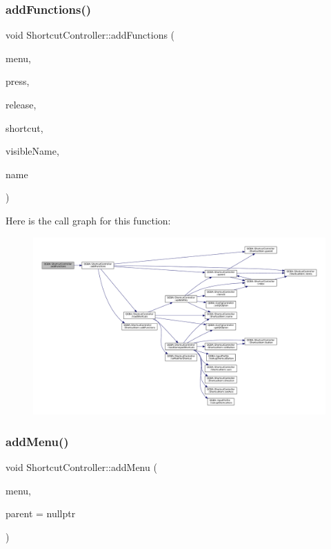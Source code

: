 \subsubsection{\texorpdfstring{add\+Functions()}{addFunctions()}\hspace{0.1cm}{\footnotesize\ttfamily [2/2]}}
{\footnotesize\ttfamily void Shortcut\+Controller\+::add\+Functions (\begin{DoxyParamCaption}\item[{Q\+Menu $\ast$}]{menu,  }\item[{std\+::function$<$ void()$>$}]{press,  }\item[{std\+::function$<$ void()$>$}]{release,  }\item[{const Q\+Key\+Sequence \&}]{shortcut,  }\item[{const Q\+String \&}]{visible\+Name,  }\item[{const Q\+String \&}]{name }\end{DoxyParamCaption})}

Here is the call graph for this function\+:
\nopagebreak
\begin{figure}[H]
\begin{center}
\leavevmode
\includegraphics[width=350pt]{class_q_g_b_a_1_1_shortcut_controller_a839498b4fa07fa34756723cf34ccb6a6_cgraph}
\end{center}
\end{figure}
\mbox{\label{class_q_g_b_a_1_1_shortcut_controller_adf81c5bc2cb82ad7388892338ab0b68b}} 
\subsubsection{\texorpdfstring{add\+Menu()}{addMenu()}}
{\footnotesize\ttfamily void Shortcut\+Controller\+::add\+Menu (\begin{DoxyParamCaption}\item[{Q\+Menu $\ast$}]{menu,  }\item[{Q\+Menu $\ast$}]{parent = {\ttfamily nullptr} }\end{DoxyParamCaption})}

